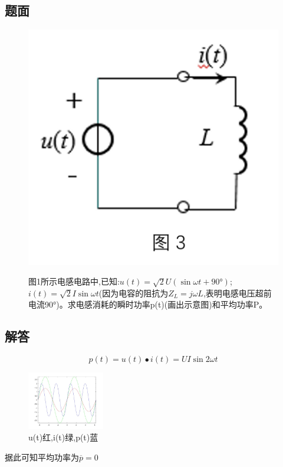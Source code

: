 \documentclass[10pt, a4paper]{article} %
\begin{document}
\subsection{题面}
\begin{figure}[htbp] %
    \centering
    \begin{minipage}[t]{0.40\textwidth} %
        \centering
        \includegraphics[width=\linewidth]{image/T3.png} %
        \label{fig:side:c}
    \end{minipage}
    \hfill %
    \begin{minipage}[t]{0.66\textwidth} %


        图1所示电感电路中,已知:$u\left(t\right) =  \sqrt{2}U(\sin\omega t + 90°) $;$i\left(t\right)=\sqrt{2}I\sin\omega t $(因为电容的阻抗为$Z_{L}=j\omega L$,表明电感电压超前电流90°)。求电感消耗的瞬时功率p(t)(画出示意图)和平均功率P。

    \end{minipage}
\end{figure}

\subsection{解答}
$$
p(t) = u(t)\bullet i(t) = UI\sin2\omega t
$$
\begin{figure}[ht]
    \centering
    \begin{minipage}[t]{\textwidth}
        \centering
        \includegraphics[width=0.3\textwidth]{image/T3.jpg}
    \caption{u(t)红,i(t)绿,p(t)蓝}
    \end{minipage}
    
\end{figure}
据此可知平均功率为$\overline{p} = 0 $
\end{document}
